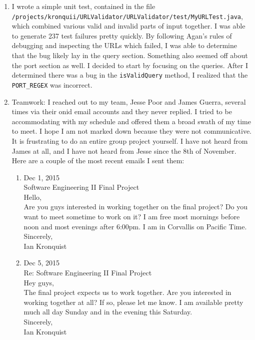 \documentclass[12pt,letterpaper]{article}
\begin{document}
\begin{enumerate}
    \item I wrote a simple unit test, contained in the file\\
    \texttt{/projects/kronquii/URLValidator/URLValidator/test/MyURLTest.java}, \\
    which combined various valid and invalid parts of input together. I was able to generate 237 test failures pretty quickly. By following Agan's rules of debugging and inspecting the URLs which failed, I was able to determine that the bug likely lay in the query section. Something also seemed off about the port section as well. I decided to start by focusing on the queries. After I determined there was a bug in the \texttt{isValidQuery} method, I realized that the \texttt{PORT\_REGEX} was incorrect.
    \item Teamwork: I reached out to my team, Jesse Poor and James Guerra, several times via their onid email accounts and they never replied. I tried to be accommodating with my schedule and offered them a broad swath of my time to meet. I hope I am not marked down because they were not communicative. It is frustrating to do an entire group project yourself. I have not heard from James at all, and I have not heard from Jesse since the 8th of November. Here are a couple of the most recent emails I sent them:\\
    \begin{enumerate}

    \item Dec 1, 2015\\
    Software Engineering II Final Project\\
    Hello,\\
    Are you guys interested in working together on the final project? Do you want to meet sometime to work on it? I am free most mornings before noon and most evenings after 6:00pm. I am in Corvallis on Pacific Time.\\

    Sincerely,\\
    Ian Kronquist\\
    \item Dec 5, 2015\\
    Re: Software Engineering II Final Project\\
    Hey guys,\\
    The final project expects us to work together. Are you interested in working together at all? If so, please let me know. I am available pretty much all day Sunday and in the evening this Saturday.\\

    Sincerely,\\
    Ian Kronquist\\
    \end{enumerate}
\end{enumerate}
\end{document}
